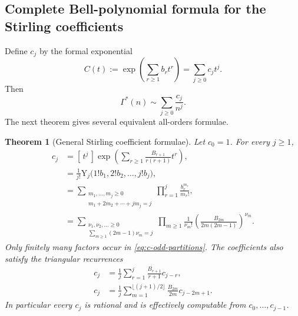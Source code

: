 \documentclass[11pt,a4paper,oneside]{article}
\newtheorem{theorem}{Theorem}[section]
\theoremstyle{definition}
\theoremstyle{remark}
\newcommand{\Coeff}[3]{[\,#1^{#2}\,]#3}
\newcommand{\BellY}{\mathrm{Y}}
\newcommand{\GammaStar}{\Gamma^{\!*}}
\newcommand{\asympseries}{\mathrel{\sim}}
\begin{document}
\subsection{Complete Bell-polynomial formula for the Stirling coefficients}
Define $c_j$ by the formal exponential
\begin{equation}\label{eq:c-generating}
 C(t):=\exp\!\left(\sum_{r\ge1}b_rt^r\right)
 =\sum_{j\ge0}c_jt^j.
\end{equation}
Then
\begin{equation}\label{eq:gammastar-series}
 \GammaStar(n)\asympseries\sum_{j\ge0}\frac{c_j}{n^j}.
\end{equation}
The next theorem gives several equivalent all-orders formulae.

\begin{theorem}[General Stirling coefficient formulae]\label{thm:cj-formulas}
Let $c_0=1$.  For every $j\ge1$,
\begin{align}
 c_j
 &=\Coeff{t}{j}{\exp\!\left(\sum_{r\ge1}
        \frac{B_{r+1}}{r(r+1)}t^r\right)},
 \label{eq:c-coeff}\\
 &=\frac1{j!}\BellY_j\bigl(1!b_1,2!b_2,\ldots,j!b_j\bigr),
 \label{eq:c-bell}\\
 &=\sum_{\substack{m_1,\ldots,m_j\ge0\\
                    m_1+2m_2+\cdots+jm_j=j}}
     \prod_{r=1}^{j}\frac{b_r^{m_r}}{m_r!},
 \label{eq:c-partitions}\\
 &=\sum_{\substack{\nu_1,\nu_2,\ldots\ge0\\
       \sum_{m\ge1}(2m-1)\nu_m=j}}
   \prod_{m\ge1}\frac{1}{\nu_m!}
   \left(\frac{B_{2m}}{2m(2m-1)}\right)^{\nu_m}.
 \label{eq:c-odd-partitions}
\end{align}
Only finitely many factors occur in \cref{eq:c-odd-partitions}.  The
coefficients also satisfy the triangular recurrences
\begin{align}
 c_j&=\frac1j\sum_{r=1}^{j}
       \frac{B_{r+1}}{r+1}c_{j-r},
 \label{eq:c-recurrence}\\
 c_j&=\frac1j\sum_{m=1}^{\lfloor(j+1)/2\rfloor}
       \frac{B_{2m}}{2m}c_{j-2m+1}.
 \label{eq:c-recurrence-odd}
\end{align}
In particular every $c_j$ is rational and is effectively computable from
$c_0,\ldots,c_{j-1}$.
\end{theorem}
\end{document}
